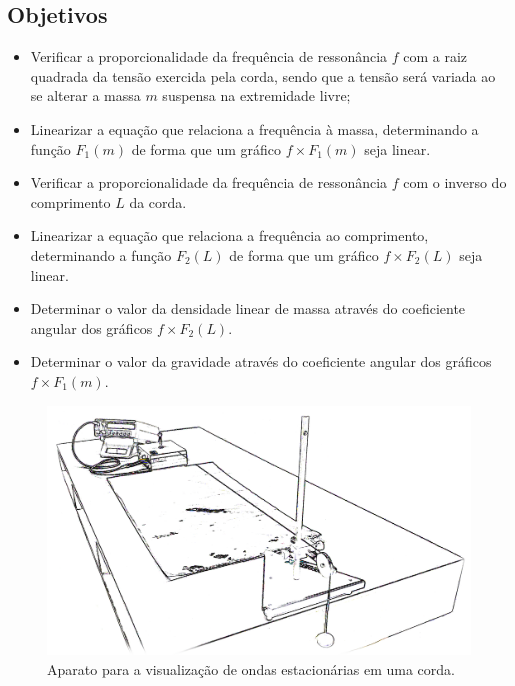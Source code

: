 \subsection{Objetivos}

\begin{itemize}
	\item Verificar a proporcionalidade da frequência de ressonância $f$ com a raiz quadrada da tensão exercida pela corda, sendo que a tensão será variada ao se alterar a massa $m$ suspensa na extremidade livre;
	\item Linearizar a equação que relaciona a frequência à massa, determinando a função $F_1(m)$ de forma que um gráfico $f \times F_1(m)$ seja linear.
	\item Verificar a proporcionalidade da frequência de ressonância $f$ com o inverso do comprimento $L$ da corda.
	\item Linearizar a equação que relaciona a frequência ao comprimento, determinando a função $F_2(L)$ de forma que um gráfico $f \times F_2(L)$ seja linear.
	\item Determinar o valor da densidade linear de massa através do coeficiente angular dos gráficos $f \times F_2(L)$.
	\item Determinar o valor da gravidade através do coeficiente angular dos gráficos $f \times F_1(m)$.
\end{itemize}

\begin{figure}
	\centering
	\includegraphics[width=\textwidth]{Ilustrations/Ondas_estacionarias.png}
	\caption{Aparato para a visualização de ondas estacionárias em uma corda.}
\end{figure}

